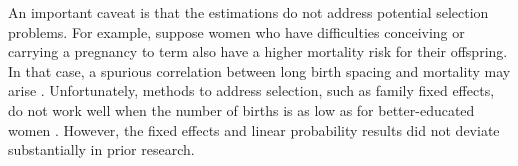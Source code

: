 \documentclass[12pt,letterpaper]{article}
\begin{document}
An important caveat is that the estimations do not 
address potential selection problems.
For example, suppose women who have diﬀiculties conceiving or carrying a pregnancy to 
term also have a higher mortality risk for their offspring. 
In that case, a spurious correlation between long birth spacing and mortality may arise 
\citep{Kozuki2013}. 
Unfortunately, methods to address selection, such as family fixed effects, do not work 
well when the number of births is as low as for better-educated women 
\citep{Kozuki2013,Molitoris2019}.
However, the fixed effects and linear probability results did not 
deviate substantially in prior research.


\end{document}
